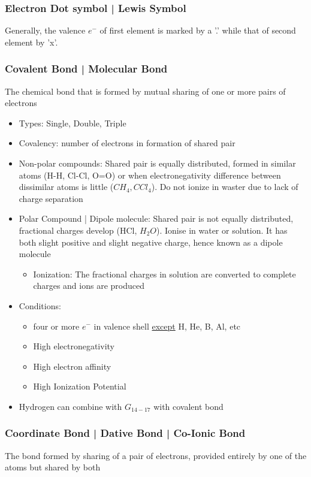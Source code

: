 \documentclass[a4paper]{article}
\begin{document}
	\subsubsection{Electron Dot symbol | Lewis Symbol}
	Generally, the valence $e^-$ of first element is marked by a '.' while that of second element by 'x'.

	\subsubsection{Covalent Bond | Molecular Bond}
	The chemical bond that is formed by mutual sharing of one or more pairs of electrons

	\begin{itemize}
		\item Types: Single, Double, Triple
		\item Covalency: number of electrons in formation of shared pair
		\item Non-polar compounds: Shared pair is equally distributed, formed in similar atoms (H-H, Cl-Cl, O=O) or when electronegativity difference between dissimilar atoms is little ($CH_4, CCl_4$). Do not ionize in waster due to lack of charge separation
		\item Polar Compound | Dipole molecule: Shared pair is not equally distributed, fractional charges develop (HCl, $H_2O$). Ionise in water or solution. It has both slight positive and slight negative charge, hence known as a dipole molecule
		\begin{itemize}
			\item Ionization: The fractional charges in solution are converted to complete charges and ions are produced
		\end{itemize}

		\item Conditions:
			\begin{itemize}
			\item four or more $e^-$ in valence shell \underline{except} H, He, B, Al, etc
			\item High electronegativity
			\item High electron affinity
			\item High Ionization Potential
		\end{itemize}
	\item Hydrogen can combine with $G_{14-17}$ with covalent bond
	\end{itemize}

	\subsubsection{Coordinate Bond | Dative Bond | Co-Ionic Bond}
	The bond formed by sharing of a pair of electrons, provided entirely by one of the atoms but shared by both
\end{document}
